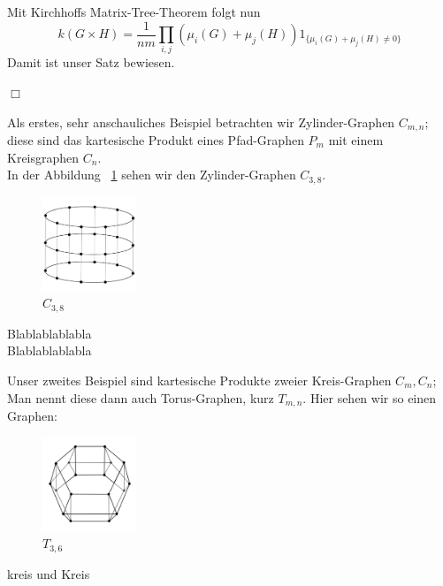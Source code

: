 Mit Kirchhoffs Matrix-Tree-Theorem folgt nun
\begin{equation}
 \mathit{k}(G \times H) = \frac{1}{nm}\displaystyle\prod_{i,j}(\mu_i(G)+\mu_j(H))1_{\{\mu_i(G)+\mu_j(H)\neq0\}}
\end{equation}
Damit ist unser Satz bewiesen.
\begin{flushright} $\Box$ \end{flushright} 
Als erstes, sehr anschauliches Beispiel betrachten wir Zylinder-Graphen $C_{m,n}$;
diese sind das kartesische Produkt eines Pfad-Graphen $P_m$ mit einem Kreisgraphen $C_n$.\\
In der Abbildung ~\ref{c8xp3} sehen wir den Zylinder-Graphen $C_{3,8}$.
\begin{figure}[H]
  \centering
 \includegraphics[width=0.25\textwidth]{c8xp3.png}
 \caption{$C_{3,8}$}
 \label{c8xp3} %
\end{figure}
\begin{Bsps}
Blablablablabla\\
Blablablablabla
\end{Bsps}
Unser zweites Beispiel sind kartesische Produkte zweier Kreis-Graphen $C_m,C_n$; Man nennt diese dann auch Torus-Graphen, kurz $T_{m,n}$. Hier sehen wir so einen Graphen:
\begin{figure}[H]
  \centering
 \includegraphics[width=0.25\textwidth]{C3xC6_4.png}
 \caption{$T_{3,6}$}
 \label{c3xc6} %
\end{figure}
\begin{Bsps}
kreis und Kreis
\end{Bsps}
